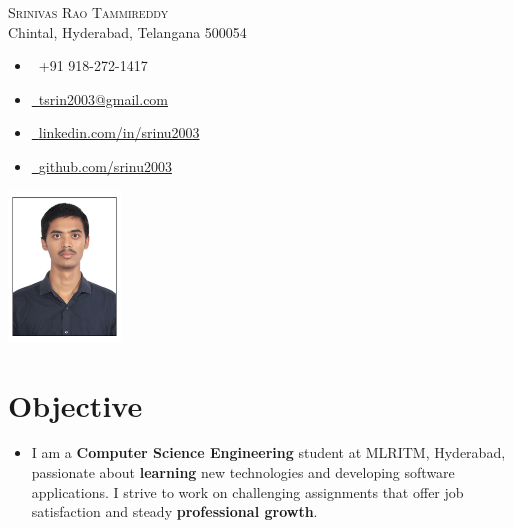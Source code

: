 \documentclass[a4paper,11pt]{article}
\begin{document}

\begin{center}
    \begin{minipage}{0.7\textwidth}
        \raggedright
        {\Huge \scshape Srinivas Rao Tammireddy} \\ \vspace{6pt}
        Chintal, Hyderabad, Telangana 500054 \\ \vspace{1pt}
        \small
        \begin{itemize}[leftmargin=0.15in, label={}]
            \item \faPhone\ +91 918-272-1417
            \item \href{mailto:tsrin2003@gmail.com}{\faEnvelope\  {tsrin2003@gmail.com}}
            \item \href{https://linkedin.com/in/srinu2003/}{\faLinkedin\ {linkedin.com/in/srinu2003}}
            \item \href{https://github.com/srinu2003}{\faGithub\ {github.com/srinu2003}}
        \end{itemize}
    \end{minipage}%
    \begin{minipage}{0.3\textwidth}
        \includegraphics[width=3cm, center]{passport-size-photo.jpg}
    \end{minipage}
\end{center}


\section{Objective}
  \begin{itemize}[leftmargin=0.15in, label={}]
    \item \fontsize{10}{12} {\selectfont
    I am a \textbf{Computer Science Engineering} student at MLRITM, Hyderabad, passionate about \textbf{learning} new technologies and developing software applications. I strive to work on challenging assignments that offer job satisfaction and steady \textbf{professional growth}.}
  \end{itemize}
\end{document}

